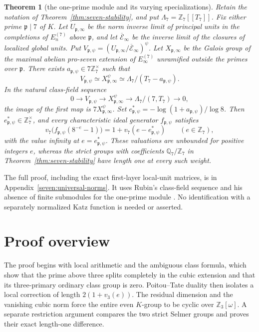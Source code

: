 \documentclass[11pt]{article}
\newtheorem{theorem}{Theorem}[section]
\theoremstyle{remark}\newtheorem{remark}[theorem]{Remark}
\newcommand{\Z}{\mathbb Z}\newcommand{\Q}{\mathbb Q}\newcommand{\F}{\mathbb F}
\begin{document}
\begin{theorem}[the one-prime module and its varying specializations]
\label{thm:seven-one-prime}
Retain the notation of Theorem~\ref{thm:seven-stability}, and put
$\Lambda_7=\Z_7[[T_7]]$. Fix either prime $\mathfrak p\mid7$ of $K$.
Let $U_{\mathfrak p,\infty}$ be the norm inverse limit of principal units
in the completions of $E_n^{(7)}$ above $\mathfrak p$, and let
$\overline{\mathcal E}_\infty$ be the inverse limit of the closures of
localized global units. Put
$V_{\mathfrak p,\psi}=(U_{\mathfrak p,\infty}/
\overline{\mathcal E}_\infty)^\psi$.
Let $X_{\mathfrak p,\infty}$ be the Galois group of the maximal abelian
pro-seven extension of $E_\infty^{(7)}$ unramified outside the primes
over $\mathfrak p$. There exists $a_{\mathfrak p,\psi}\in7\Z_7^\times$
such that
\[
 V_{\mathfrak p,\psi}\simeq X_{\mathfrak p,\infty}^\psi
 \simeq\Lambda_7/(T_7-a_{\mathfrak p,\psi}).
\]
In the natural class-field sequence
\[
 0\longrightarrow V_{\mathfrak p,\psi}
 \longrightarrow X_{\mathfrak p,\infty}^\psi
 \longrightarrow\Lambda_7/(7,T_7)\longrightarrow0,
\]
the image of the first map is $7X_{\mathfrak p,\infty}^\psi$.
Set $e_{\mathfrak p,\psi}^*=-\log(1+a_{\mathfrak p,\psi})/\log8$.
Then $e_{\mathfrak p,\psi}^*\in\Z_7^\times$, and every characteristic
ideal generator $f_{\mathfrak p,\psi}$ satisfies
\[
 v_7\bigl(f_{\mathfrak p,\psi}(8^{-e}-1)\bigr)
 =1+v_7(e-e_{\mathfrak p,\psi}^*)\qquad(e\in\Z_7),
\]
with the value infinity at $e=e_{\mathfrak p,\psi}^*$.
These valuations are unbounded for positive integers $e$, whereas
the strict groups with coefficients $\Q_7/\Z_7$ in
Theorem~\ref{thm:seven-stability} have length one at every such weight.
\end{theorem}

The full proof, including the exact first-layer local-unit matrices,
is in Appendix~\ref{seven:universal-norms}. It uses Rubin's class-field
sequence and his absence of finite submodules for the one-prime module
\citep[equation~(5), p.~36; Theorem~5.3(v), pp.~40--41]{Rubin}.
No identification with a separately normalized Katz function is needed
or asserted.

\section{Proof overview}
The proof begins with local arithmetic and the ambiguous class formula, which show that the prime above three splits completely in the cubic extension and that its three-primary ordinary class group is zero.
Poitou--Tate duality then isolates a local correction of length $2(1+v_3(e))$.
The residual dimension and the vanishing cubic norm force the entire even $K$-group to be cyclic over $\Z_3[\omega]$.
A separate restriction argument compares the two strict Selmer groups and proves their exact length-one difference.
\end{document}
